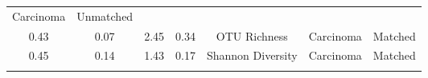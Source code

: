 \documentclass[12pt,]{article}
\begin{document}
\begin{longtable}[]{@{}ccccccc@{}}
\begin{minipage}[t]{0.09\columnwidth}
Carcinoma\strut
\end{minipage} & \begin{minipage}[t]{0.11\columnwidth}\centering\strut
Unmatched\strut
\end{minipage}\tabularnewline
\begin{minipage}[t]{0.09\columnwidth}\centering\strut
0.43\strut
\end{minipage} & \begin{minipage}[t]{0.16\columnwidth}\centering\strut
0.07\strut
\end{minipage} & \begin{minipage}[t]{0.16\columnwidth}\centering\strut
2.45\strut
\end{minipage} & \begin{minipage}[t]{0.07\columnwidth}\centering\strut
0.34\strut
\end{minipage} & \begin{minipage}[t]{0.14\columnwidth}\centering\strut
OTU Richness\strut
\end{minipage} & \begin{minipage}[t]{0.09\columnwidth}\centering\strut
Carcinoma\strut
\end{minipage} & \begin{minipage}[t]{0.11\columnwidth}\centering\strut
Matched\strut
\end{minipage}\tabularnewline
\begin{minipage}[t]{0.09\columnwidth}\centering\strut
0.45\strut
\end{minipage} & \begin{minipage}[t]{0.16\columnwidth}\centering\strut
0.14\strut
\end{minipage} & \begin{minipage}[t]{0.16\columnwidth}\centering\strut
1.43\strut
\end{minipage} & \begin{minipage}[t]{0.07\columnwidth}\centering\strut
0.17\strut
\end{minipage} & \begin{minipage}[t]{0.14\columnwidth}\centering\strut
Shannon Diversity\strut
\end{minipage} & \begin{minipage}[t]{0.09\columnwidth}\centering\strut
Carcinoma\strut
\end{minipage} & \begin{minipage}[t]{0.11\columnwidth}\centering\strut
Matched\strut
\end{minipage}\tabularnewline
\begin{minipage}[t]{0.09\columnwidth}\centering\strut

\end{minipage}
\end{longtable}
\end{document}

